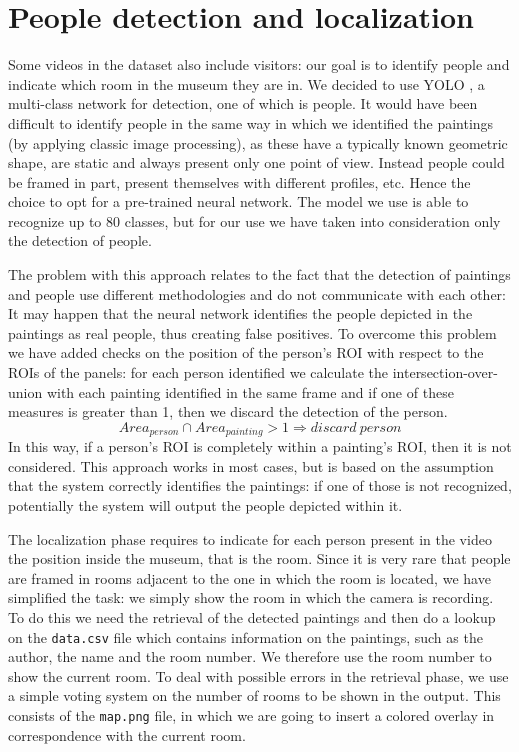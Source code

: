 \documentclass[10pt,twocolumn,letterpaper]{article}
\begin{document}
\section{People detection and localization}
\label{sec:PeopleDetectionAndLocalization}
Some videos in the dataset also include visitors: our goal is to identify people and indicate which room in the museum they are in. We decided to use YOLO \cite{redmon2015unified}, a multi-class network for detection, one of which is people. It would have been difficult to identify people in the same way in which we identified the paintings (by applying classic image processing), as these have a typically known geometric shape, are static and always present only one point of view. Instead people could be framed in part, present themselves with different profiles, etc. Hence the choice to opt for a pre-trained neural network. The model we use is able to recognize up to 80 classes, but for our use we have taken into consideration only the detection of people.

The problem with this approach relates to the fact that the detection of paintings and people use different methodologies and do not communicate with each other: It may happen that the neural network identifies the people depicted in the paintings as real people, thus creating false positives. To overcome this problem we have added checks on the position of the person's ROI with respect to the ROIs of the panels: for each person identified we calculate the intersection-over-union with each painting identified in the same frame and if one of these measures is greater than 1, then we discard the detection of the person.
\begin{equation}
\label{eq:DiscardPerson}
Area_{person} \cap Area_{painting} > 1 \Longrightarrow discard\ person
\end{equation}
In this way, if a person's ROI is completely within a painting's ROI, then it is not considered. This approach works in most cases, but is based on the assumption that the system correctly identifies the paintings: if one of those is not recognized, potentially the system will output the people depicted within it.

The localization phase requires to indicate for each person present in the video the position inside the museum, that is the room. Since it is very rare that people are framed in rooms adjacent to the one in which the room is located, we have simplified the task: we simply show the room in which the camera is recording. To do this we need the retrieval of the detected paintings and then do a lookup on the \texttt{data.csv} file which contains information on the paintings, such as the author, the name and the room number. We therefore use the room number to show the current room. To deal with possible errors in the retrieval phase, we use a simple voting system on the number of rooms to be shown in the output. This consists of the \texttt{map.png} file, in which we are going to insert a colored overlay in correspondence with the current room.
\end{document}
